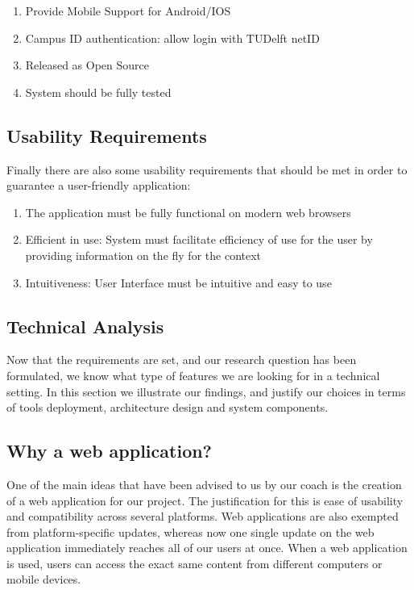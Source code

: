 \begin{enumerate}
	\item Provide Mobile Support for Android/IOS
	\item Campus ID authentication: allow login with TUDelft netID
	\item Released as Open Source
 	\item System should be fully tested 
\end{enumerate}

\subsection{Usability Requirements} %

Finally there are also some usability requirements that should be met in order to guarantee a user-friendly application:

\label{sub:usability_requirements}
\begin{enumerate}
	\item The application must be fully functional on modern web browsers
	\item Efficient in use: System must facilitate efficiency of use for the user by providing information on the fly for the context
	\item Intuitiveness: User Interface must be intuitive and easy to use
\end{enumerate}
\newpage
\subsection{Technical Analysis} %

Now that the requirements are set, and our research question has been formulated, we know what type of features we are looking for in a technical setting. In this section we illustrate our findings, and justify our choices in terms of tools deployment, architecture design and system components.

\subsection{Why a web application?}
One of the main ideas that have been advised to us by our coach is the creation of a web application for our project. The justification for this is ease of usability and compatibility across several platforms. Web applications are also exempted from platform-specific updates, whereas now one single update on the web application immediately reaches all of our users at once. When a web application is used, users can access the exact same content from different computers or mobile devices.

